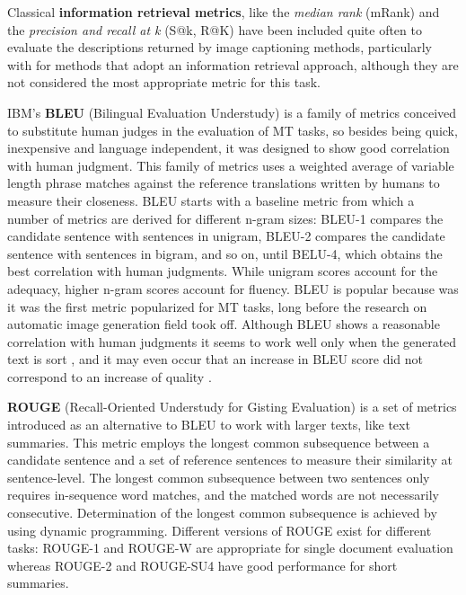 Classical \textbf{information retrieval metrics}, like the \textit{median rank} (mRank) and the \textit{precision and recall at k} (S@k, R@K) have been included quite often to evaluate the descriptions returned by image captioning methods, particularly with for methods that adopt an information retrieval approach, although they are not considered the most appropriate metric for this task.

IBM's \textbf{BLEU} (Bilingual Evaluation Understudy) \citep{Papineni2002} is a family of metrics conceived to substitute human judges in the evaluation of MT tasks, so besides being quick, inexpensive and language independent, it was designed to show good correlation with human judgment. This family of metrics uses a weighted average of variable length phrase matches against the reference translations written by humans to measure their closeness. BLEU starts with a baseline metric from which a number of metrics are derived for different n-gram sizes: BLEU-1 compares the candidate sentence with sentences in unigram, BLEU-2 compares the candidate sentence with sentences in bigram, and so on, until BELU-4, which obtains the best correlation with human judgments. While unigram scores account for the adequacy, higher n-gram scores account for fluency. BLEU is popular because was it was the first metric popularized for MT tasks, long before the research on automatic image generation field took off. Although BLEU shows a reasonable correlation with human judgments it seems to work well only when the generated text is sort  \citep{Callison-Burch2006}, and it may even occur that an increase in BLEU score did not correspond to an increase of quality \citep{Lin2004b}.

\textbf{ROUGE} (Recall-Oriented Understudy for Gisting Evaluation) \citep{Lin2004a} is a set of metrics introduced as an alternative to BLEU to work with larger texts, like text summaries. This metric employs the longest common subsequence between a candidate sentence and a set of reference sentences to measure their similarity at sentence-level. The longest common subsequence between two sentences only requires in-sequence word matches, and the matched words are not necessarily consecutive. Determination of the longest common subsequence is achieved by using dynamic programming. Different versions of ROUGE exist for different tasks: ROUGE-1 and ROUGE-W are appropriate for single document evaluation whereas ROUGE-2 and ROUGE-SU4 have good performance for short summaries. 

